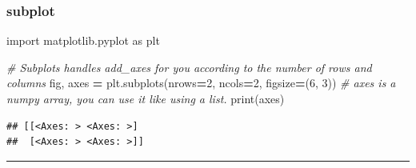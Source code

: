 \documentclass[
]{book}
\newenvironment{Shaded}{\begin{snugshade}}{\end{snugshade}}
\newcommand{\BuiltInTok}[1]{#1}
\newcommand{\CommentTok}[1]{\textcolor[rgb]{0.56,0.35,0.01}{\textit{#1}}}
\newcommand{\DecValTok}[1]{\textcolor[rgb]{0.00,0.00,0.81}{#1}}
\newcommand{\ImportTok}[1]{#1}
\newcommand{\NormalTok}[1]{#1}
\newcommand{\OperatorTok}[1]{\textcolor[rgb]{0.81,0.36,0.00}{\textbf{#1}}}
\theoremstyle{definition}
\theoremstyle{definition}
\theoremstyle{definition}
\theoremstyle{definition}
\theoremstyle{remark}
\begin{document}
\hypertarget{subplot}{%
\subsubsection{subplot}\label{subplot}}

\begin{Shaded}
\begin{Highlighting}[]
\ImportTok{import}\NormalTok{ matplotlib.pyplot }\ImportTok{as}\NormalTok{ plt}

\CommentTok{\# Subplots handles add\_axes for you according to the number of rows and columns}
\NormalTok{fig, axes }\OperatorTok{=}\NormalTok{ plt.subplots(nrows}\OperatorTok{=}\DecValTok{2}\NormalTok{, ncols}\OperatorTok{=}\DecValTok{2}\NormalTok{, figsize}\OperatorTok{=}\NormalTok{(}\DecValTok{6}\NormalTok{, }\DecValTok{3}\NormalTok{))}
\CommentTok{\# axes is a numpy array, you can use it like using a list.}
\BuiltInTok{print}\NormalTok{(axes)}
\end{Highlighting}
\end{Shaded}

\begin{verbatim}
## [[<Axes: > <Axes: >]
##  [<Axes: > <Axes: >]]
\end{verbatim}

\begin{center}\rule{0.5\linewidth}{0.5pt}\end{center}
\end{document}
